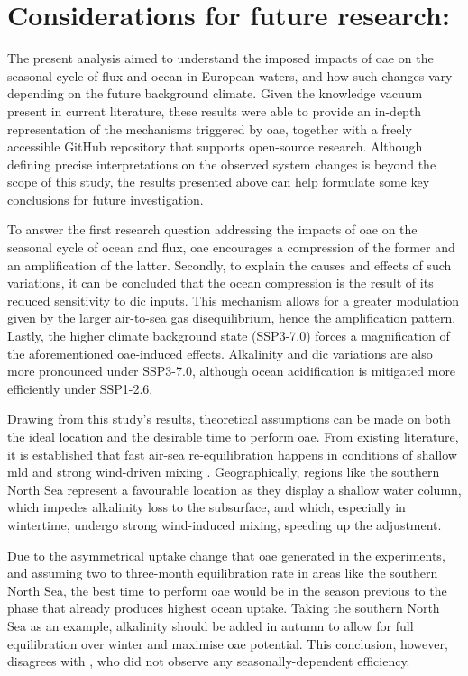 \chapter{Considerations for future research:}

The present analysis aimed to understand the imposed impacts of \ac{oae} on the seasonal cycle of  flux and ocean  in European waters, and how such changes vary depending on the future background climate. Given the knowledge vacuum present in current literature, these results were able to provide an in-depth representation of the mechanisms triggered by \ac{oae}, together with a freely accessible GitHub repository that supports open-source research. Although defining precise interpretations on the observed system changes is beyond the scope of this study, the results presented above can help formulate some key conclusions for future investigation. 

To answer the first research question addressing the impacts of \ac{oae} on the seasonal cycle of ocean  and  flux, \ac{oae} encourages a compression of the former and an amplification of the latter. Secondly, to explain the causes and effects of such variations, it can be concluded that the ocean  compression is the result of its reduced sensitivity to \ac{dic} inputs. This mechanism allows for a greater  modulation given by the larger air-to-sea gas disequilibrium, hence the  amplification pattern. Lastly, the higher climate background state (SSP3-7.0) forces a magnification of the aforementioned \ac{oae}-induced effects. Alkalinity and \ac{dic} variations are also more pronounced under SSP3-7.0, although ocean acidification is mitigated more efficiently under SSP1-2.6. 

Drawing from this study's results, theoretical assumptions can be made on both the ideal location and the desirable time to perform \ac{oae}. From existing literature, it is established that fast air-sea re-equilibration happens in conditions of shallow \ac{mld} and strong wind-driven mixing \citep{jones2014spatial}. Geographically, regions like the southern North Sea represent a favourable location as they display a shallow water column, which impedes alkalinity loss to the subsurface, and which, especially in wintertime, undergo strong wind-induced mixing, speeding up the adjustment.

Due to the asymmetrical uptake change that \ac{oae} generated in the experiments, and assuming two to three-month equilibration rate in areas like the southern North Sea, the best time to perform \ac{oae} would be in the season previous to the phase that already produces highest ocean  uptake. Taking the southern North Sea as an example, alkalinity should be added in autumn to allow for full equilibration over winter and maximise \ac{oae} potential. This conclusion, however, disagrees with \cite{lenton2018assessing}, who did not observe any seasonally-dependent efficiency. 

